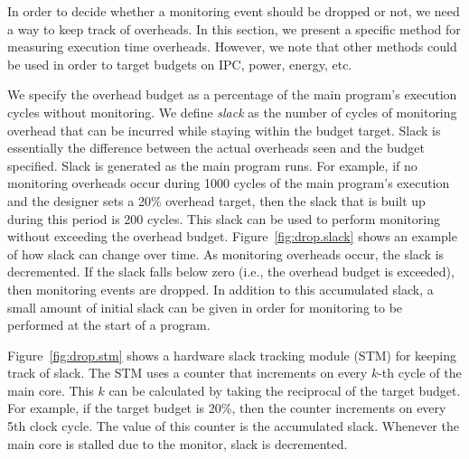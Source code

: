 In order to decide whether a monitoring event should be dropped or not, we need
a way to keep track of overheads. In this section, we present a specific method
for measuring execution time overheads. However, we note that other methods
could be used in order to target budgets on IPC, power, energy, etc.  

We specify the overhead budget as a percentage of the main program's execution
cycles without monitoring. We define \emph{slack} as the number of cycles of
monitoring overhead that can be incurred while staying within the budget
target. Slack is essentially the difference between the actual overheads seen
and the budget specified. Slack is generated as the main program runs.  For
example, if no monitoring overheads occur during 1000 cycles of the main
program's execution and the designer sets a 20\% overhead target, then the
slack that is built up during this period is 200 cycles. This slack can be used
to perform monitoring without exceeding the overhead budget.
Figure~\ref{fig:drop.slack} shows an example of how slack can change over time.
As monitoring overheads occur, the slack is decremented. 
If the slack falls below zero (i.e., the overhead budget is exceeded), then
monitoring events are dropped.
In addition to this accumulated slack, a small amount of initial slack
can be given in order for monitoring to be performed at the start of a program.

Figure~\ref{fig:drop.stm} shows a hardware slack tracking module (STM) for
keeping track of slack. The STM uses a counter that increments on every $k$-th
cycle of the main core. This $k$ can be calculated by taking the reciprocal of
the target budget. For example, if the target budget is 20\%, then the counter
increments on every 5th clock cycle. The value of this counter is the
accumulated slack. Whenever the main core is stalled due to the monitor, slack
is decremented.

